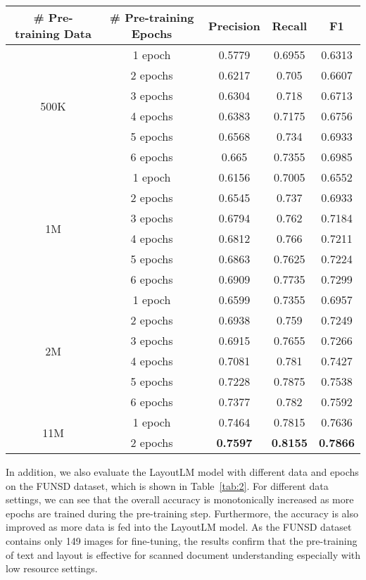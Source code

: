 \documentclass[sigconf]{acmart}
\begin{document}
\begin{table*}[ht]
    \centering
    \begin{tabular}{ccccc}
    \toprule
     \bf \# Pre-training Data & \bf \# Pre-training Epochs & \bf Precision & \bf Recall & \bf F1   \\\midrule
     \multirow{6}{*}{500K} & 1 epoch   & 0.5779  & 0.6955 & 0.6313  \\
     & 2 epochs   & 0.6217 & 0.705 & 0.6607  \\
     & 3 epochs   & 0.6304 & 0.718 & 0.6713  \\
     & 4 epochs   & 0.6383 & 0.7175 & 0.6756  \\
     & 5 epochs   & 0.6568 & 0.734 & 0.6933  \\
     & 6 epochs   & 0.665 & 0.7355 & 0.6985  \\\midrule
     \multirow{6}{*}{1M}& 1 epoch   & 0.6156 & 0.7005  & 0.6552  \\
     & 2 epochs  & 0.6545	& 0.737  & 0.6933  \\
     & 3 epochs  & 0.6794	& 0.762 & 0.7184  \\
     & 4 epochs  & 0.6812	& 0.766 & 0.7211  \\
     & 5 epochs  & 0.6863	& 0.7625 & 0.7224  \\
     & 6 epochs  & 0.6909	& 0.7735 & 0.7299  \\\midrule
     \multirow{6}{*}{2M} & 1 epoch   & 0.6599 & 0.7355 & 0.6957 \\
      & 2 epochs   & 0.6938  & 0.759  & 0.7249  \\
      & 3 epochs   & 0.6915 & 0.7655  & 0.7266  \\
      & 4 epochs   & 0.7081 & 0.781  & 0.7427  \\
      & 5 epochs   & 0.7228 & 0.7875  & 0.7538  \\
      & 6 epochs   & 0.7377 & 0.782  & 0.7592  \\\midrule
     \multirow{2}{*}{11M} & 1 epoch  & 0.7464 & 0.7815 & 0.7636  \\
     & 2 epochs  & \bf 0.7597 & \bf 0.8155  & \bf 0.7866 \\
\bottomrule
    \end{tabular}
    \caption{~(Text + Layout, MVLM) accuracy with different data and epochs on the FUNSD dataset}
    \label{tab:2}
\end{table*}

In addition, we also evaluate the LayoutLM model with different data and epochs on the FUNSD dataset, which is shown in Table~\ref{tab:2}. For different data settings, we can see that the overall accuracy is monotonically increased as more epochs are trained during the pre-training step. Furthermore, the accuracy is also improved as more data is fed into the LayoutLM model. As the FUNSD dataset contains only 149 images for fine-tuning, the results confirm that the pre-training of text and layout is effective for scanned document understanding especially with low resource settings.
\end{document}
